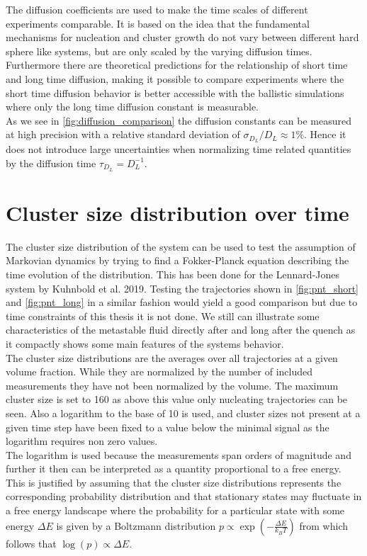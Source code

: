 The diffusion coefficients are used to make the time scales of different experiments comparable. It is based on the idea that the fundamental mechanisms for nucleation and cluster growth do not vary between different hard sphere like systems, but are only scaled by the varying diffusion times. Furthermore there are theoretical predictions for the relationship of short time and long time diffusion, making it possible to compare experiments where the short time diffusion behavior is better accessible with the ballistic simulations where only the long time diffusion constant is measurable.\\


As we see in \autoref{fig:diffusion_comparison} the diffusion constants can be measured at high precision with a relative standard deviation of $\sigma_{D_L}/D_L \approx 1\%$. Hence it does not introduce large uncertainties when normalizing time related quantities by the diffusion time $\tau_{D_L} = D_L^{-1}$.

\section{Cluster size distribution over time}
\label{sec:pnt}
The cluster size distribution of the system can be used to test the assumption of Markovian dynamics by trying to find a Fokker-Planck equation describing the time evolution of the distribution. This has been done for the Lennard-Jones system by Kuhnbold et al. 2019\cite{Kuhnbold2019}. Testing the trajectories shown in \autoref{fig:pnt_short} and \autoref{fig:pnt_long} in a similar fashion would yield a good comparison but due to time constraints of this thesis it is not done. We still can illustrate some characteristics of the metastable fluid directly after and long after the quench as it compactly shows some main features of the systems behavior.\\ 

The cluster size distributions are the averages over all trajectories at a given volume fraction. While they are normalized by the number of included measurements they have not been normalized by the volume. The maximum cluster size is set to 160 as above this value only nucleating trajectories can be seen. Also a logarithm to the base of 10 is used, and cluster sizes not present at a given time step have been fixed to a value below the minimal signal as the logarithm requires non zero values.\\
The logarithm is used because the measurements span orders of magnitude and further it then can be interpreted as a quantity proportional to a free energy. This is justified by assuming that the cluster size distributions represents the corresponding probability distribution and that stationary states may fluctuate in a free energy landscape where the probability for a particular state with some energy $\Delta E$ is given by a Boltzmann distribution $p\propto \exp \left( - \frac{\Delta E}{k_B T} \right)$ from which follows that $\log(p) \propto \Delta E$.\\


